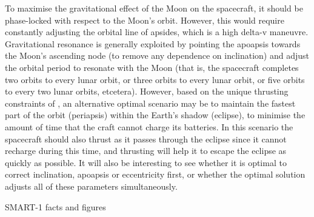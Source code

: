 To maximise the gravitational effect of the Moon on the spacecraft, it should be phase-locked with respect to the Moon's orbit. However, this would require constantly adjusting the orbital line of apsides, which is a high delta-v maneuvre. Gravitational resonance is generally exploited by pointing the apoapsis towards the Moon's ascending node (to remove any dependence on inclination) and adjust the orbital period to resonate with the Moon (that is, the spacecraft completes two orbits to every lunar orbit, or three orbits to every lunar orbit, or five orbits to every two lunar orbits, etcetera). However, based on the unique thrusting constraints of \BW, an alternative optimal scenario may be to maintain the fastest part of the orbit (periapsis) within the Earth's shadow (eclipse), to minimise the amount of time that the craft cannot charge its batteries. In this scenario the spacecraft should also thrust as it passes through the eclipse since it cannot recharge during this time, and thrusting will help it to escape the eclipse as quickly as possible. It will also be interesting to see whether it is optimal to correct inclination, apoapsis or eccentricity first, or whether the optimal solution adjusts all of these parameters simultaneously.
 

 



\cite{Estublier2007} SMART-1 facts and figures
